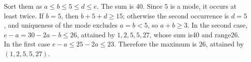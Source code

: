 Sort them as $a\le b\le5\le d\le e$. The sum is $40$. Since $5$ is a mode, it occurs at least twice. If $b=5$, then $b+5+d\ge15$; otherwise the second occurrence is $d=5$, and uniqueness of the mode excludes $a=b<5$, so $a+b\ge3$. In the second case, $e-a=30-2a-b\le26$, attained by $1,2,5,5,27$, whose sum is40 and range26. In the first case $e-a\le25-2a\le23$. Therefore the maximum is $\boxed{26}$, attained by $(1,2,5,5,27)$.
